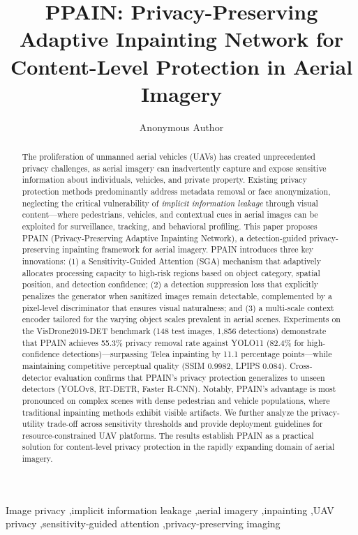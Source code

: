 \documentclass[preprint,12pt]{elsarticle}
\begin{document}
\begin{frontmatter}

\title{PPAIN: Privacy-Preserving Adaptive Inpainting Network for Content-Level Protection in Aerial Imagery}

\author[inst1]{Anonymous Author}


\begin{abstract}
The proliferation of unmanned aerial vehicles (UAVs) has created unprecedented privacy challenges, as aerial imagery can inadvertently capture and expose sensitive information about individuals, vehicles, and private property. Existing privacy protection methods predominantly address metadata removal or face anonymization, neglecting the critical vulnerability of \emph{implicit information leakage} through visual content---where pedestrians, vehicles, and contextual cues in aerial images can be exploited for surveillance, tracking, and behavioral profiling. This paper proposes PPAIN (Privacy-Preserving Adaptive Inpainting Network), a detection-guided privacy-preserving inpainting framework for aerial imagery. PPAIN introduces three key innovations: (1) a Sensitivity-Guided Attention (SGA) mechanism that adaptively allocates processing capacity to high-risk regions based on object category, spatial position, and detection confidence; (2) a detection suppression loss that explicitly penalizes the generator when sanitized images remain detectable, complemented by a pixel-level discriminator that ensures visual naturalness; and (3) a multi-scale context encoder tailored for the varying object scales prevalent in aerial scenes. Experiments on the VisDrone2019-DET benchmark (148 test images, 1,856 detections) demonstrate that PPAIN achieves 55.3\% privacy removal rate against YOLO11 (82.4\% for high-confidence detections)---surpassing Telea inpainting by 11.1 percentage points---while maintaining competitive perceptual quality (SSIM 0.9982, LPIPS 0.084). Cross-detector evaluation confirms that PPAIN's privacy protection generalizes to unseen detectors (YOLOv8, RT-DETR, Faster R-CNN). Notably, PPAIN's advantage is most pronounced on complex scenes with dense pedestrian and vehicle populations, where traditional inpainting methods exhibit visible artifacts. We further analyze the privacy-utility trade-off across sensitivity thresholds and provide deployment guidelines for resource-constrained UAV platforms. The results establish PPAIN as a practical solution for content-level privacy protection in the rapidly expanding domain of aerial imagery.

\end{abstract}

\begin{keyword}
Image privacy \sep implicit information leakage \sep aerial imagery \sep inpainting \sep UAV privacy \sep sensitivity-guided attention \sep privacy-preserving imaging
\end{keyword}

\end{frontmatter}
\end{document}
